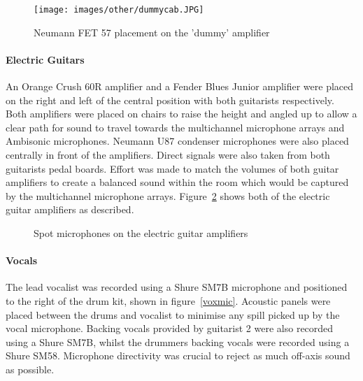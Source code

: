 				\begin{figure}[ht]
				\begin{center}
					\texttt{[image: images/other/dummycab.JPG]}
					\caption{Neumann FET 57 placement on the 'dummy' amplifier}
					\label{drums}
				\end{center}
				\end{figure}

			\paragraph{Electric Guitars}
				An Orange Crush 60R amplifier and a Fender Blues Junior amplifier were placed on the right and left of the central position with both guitarists respectively. Both amplifiers were placed on chairs to raise the height and angled up to allow a clear path for sound to travel towards the multichannel microphone arrays and Ambisonic microphones. Neumann U87 condenser microphones were also placed centrally in front of the amplifiers. Direct signals were also taken from both guitarists pedal boards. Effort was made to match the volumes of both guitar amplifiers to create a balanced sound within the room which would be captured by the multichannel microphone arrays. Figure~\ref{guitarAmps} shows both of the electric guitar amplifiers as described.\\

				\begin{figure}
					\centering
					\caption{Spot microphones on the electric guitar amplifiers}
					\label{guitarAmps}
				\end{figure}

			\paragraph{Vocals}
				The lead vocalist was recorded using a Shure SM7B microphone and positioned to the right of the drum kit, shown in figure~\ref{voxmic}. Acoustic panels were placed between the drums and vocalist to minimise any spill picked up by the vocal microphone. Backing vocals provided by guitarist 2 were also recorded using a Shure SM7B, whilst the drummers backing vocals were recorded using a Shure SM58. Microphone directivity was crucial to reject as much off-axis sound as possible.\\

